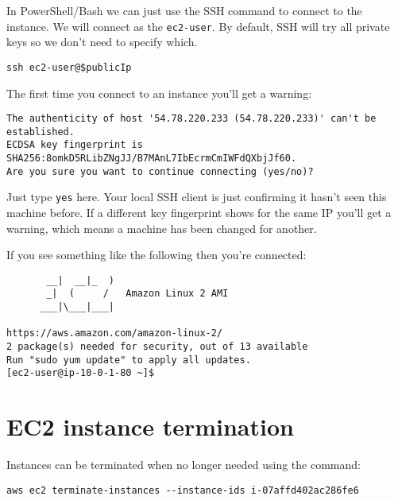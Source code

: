 In PowerShell/Bash we can just use the SSH command to connect to the
instance. We will connect as the \texttt{ec2-user}. By default, SSH will
try all private keys so we don't need to specify which.

\begin{verbatim}
ssh ec2-user@$publicIp 
\end{verbatim}

The first time you connect to an instance you'll get a warning:

\begin{verbatim}
The authenticity of host '54.78.220.233 (54.78.220.233)' can't be established.
ECDSA key fingerprint is SHA256:8omkD5RLibZNgJJ/B7MAnL7IbEcrmCmIWFdQXbjJf60.
Are you sure you want to continue connecting (yes/no)?
\end{verbatim}

Just type \texttt{yes} here. Your local SSH client is just confirming it
hasn't seen this machine before. If a different key fingerprint shows
for the same IP you'll get a warning, which means a machine has been
changed for another.

If you see something like the following then you're connected:

\begin{verbatim}
       __|  __|_  )
       _|  (     /   Amazon Linux 2 AMI
      ___|\___|___|

https://aws.amazon.com/amazon-linux-2/
2 package(s) needed for security, out of 13 available
Run "sudo yum update" to apply all updates.
[ec2-user@ip-10-0-1-80 ~]$ 
\end{verbatim}

\section{EC2 instance termination}\label{ec2-instance-termination}

Instances can be terminated when no longer needed using the command:

\begin{verbatim}
aws ec2 terminate-instances --instance-ids i-07affd402ac286fe6
\end{verbatim}
